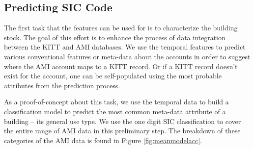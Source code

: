 \subsection{Predicting SIC Code}
\label{sec:predictinsiccode}

The first task that the features can be used for is to characterize the building stock. The goal of this effort is to enhance the process of data integration between the KITT and AMI databases. We use the temporal features to predict various conventional features or meta-data about the accounts in order to suggest where the AMI account maps to a KITT record. Or if a KITT record doesn’t exist for the account, one can be self-populated using the most probable attributes from the prediction process. 

As a proof-of-concept about this task, we use the temporal data to build a classification model to predict the most common meta-data attribute of a building – its general use type. We use the one digit SIC classification to cover the entire range of AMI data in this preliminary step. The breakdown of these categories of the AMI data is found in Figure \ref{fig:meanmodelacc}.
